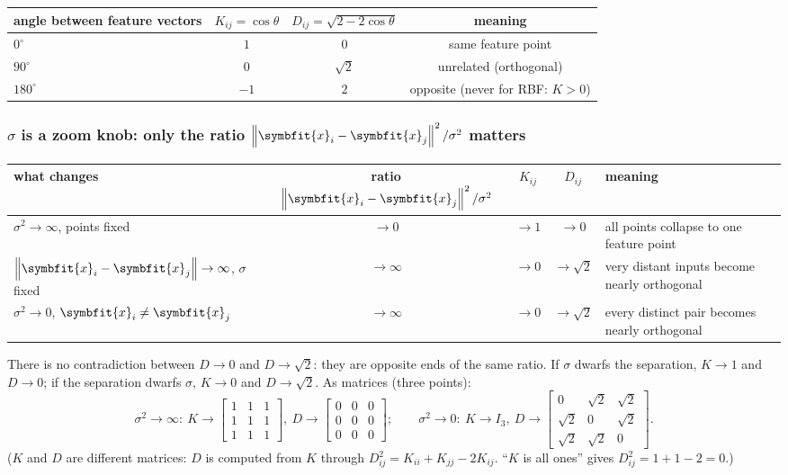 \documentclass[11pt]{article}
\newcommand{\bm}[1]{\symbfit{#1}}
\newcommand{\vx}{\bm{x}}
\newcommand{\norm}[1]{\left\lVert #1\right\rVert}
\begin{document}
\begin{center}
\renewcommand{\arraystretch}{1.3}
\small
\begin{tabular}{@{}lccc@{}}
\toprule
angle between feature vectors & $K_{ij}=\cos\theta$ & $D_{ij}=\sqrt{2-2\cos\theta}$ & meaning \\
\midrule
$0^\circ$ & $1$ & $0$ & same feature point \\
$90^\circ$ & $0$ & $\sqrt2$ & unrelated (orthogonal) \\
$180^\circ$ & $-1$ & $2$ & opposite (never for RBF: $K>0$) \\
\bottomrule
\end{tabular}
\end{center}

\subsubsection*{\texorpdfstring{$\sigma$}{sigma} is a zoom knob: only the ratio $\norm{\vx_i-\vx_j}^2/\sigma^2$ matters}

\begin{center}
\renewcommand{\arraystretch}{1.35}
\small
\begin{tabular}{@{}>{\raggedright\arraybackslash}p{4.0cm}ccc>{\raggedright\arraybackslash}p{4.4cm}@{}}
\toprule
what changes & ratio $\norm{\vx_i-\vx_j}^2/\sigma^2$ & $K_{ij}$ & $D_{ij}$ & meaning \\
\midrule
$\sigma^2\to\infty$, points fixed & $\to0$ & $\to1$ & $\to0$ & all points collapse to one feature point \\
$\norm{\vx_i-\vx_j}\to\infty$, $\sigma$ fixed & $\to\infty$ & $\to0$ & $\to\sqrt2$ & very distant inputs become nearly orthogonal \\
$\sigma^2\to0$, $\vx_i\ne\vx_j$ & $\to\infty$ & $\to0$ & $\to\sqrt2$ & every distinct pair becomes nearly orthogonal \\
\bottomrule
\end{tabular}
\end{center}

\noindent There is no contradiction between $D\to0$ and $D\to\sqrt2$: they are opposite ends of the same ratio. If $\sigma$ dwarfs the separation,
$K\to1$ and $D\to0$; if the separation dwarfs $\sigma$, $K\to0$ and $D\to\sqrt2$. As matrices (three points):
\[
\sigma^2\to\infty:\ K\to\begin{bmatrix}1&1&1\\1&1&1\\1&1&1\end{bmatrix},\ D\to\begin{bmatrix}0&0&0\\0&0&0\\0&0&0\end{bmatrix};
\qquad
\sigma^2\to0:\ K\to I_3,\ D\to\begin{bmatrix}0&\sqrt2&\sqrt2\\\sqrt2&0&\sqrt2\\\sqrt2&\sqrt2&0\end{bmatrix}.
\]
($K$ and $D$ are different matrices: $D$ is computed from $K$ through $D_{ij}^2=K_{ii}+K_{jj}-2K_{ij}$. ``$K$ is all ones'' gives $D_{ij}^2=1+1-2=0$.)
\end{document}
